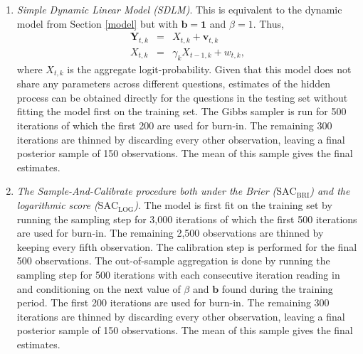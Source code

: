 \documentclass[aoas, preprint]{imsart}
\numberwithin{equation}{section}
\theoremstyle{plain}
\begin{document}
\begin{enumerate}
\item \textit{Simple Dynamic Linear Model (SDLM)}. This is equivalent to the dynamic model from Section \ref{model} but with $\boldsymbol{b} = \boldsymbol{1}$ and $\beta = 1$. Thus,
\begin{eqnarray*}
\boldsymbol{Y}_{t, k} &=&  X_{t, k} + \boldsymbol{v}_{t, k}  \\
X_{t, k} &=& \gamma_k X_{t-1, k} + w_{t, k},
\end{eqnarray*}
where $X_{t,k}$ is the aggregate logit-probability. Given that this model does not share any parameters across different questions, estimates of the hidden process can be obtained directly for the questions in the testing set without fitting the model first on the training set. The Gibbs sampler is run for 500 iterations of which the first 200 are used for burn-in. The remaining 300 iterations are thinned by discarding every other observation, leaving a final posterior sample of 150 observations. The mean of this sample gives the final estimates. 

\item \textit{The Sample-And-Calibrate procedure both under the Brier ($\text{SAC}_{\text{BRI}}$) and the logarithmic score ($\text{SAC}_{\text{LOG}}$)}. The model is first fit on the training set by running the sampling step for 3,000 iterations of which the first 500 iterations are used for burn-in. The remaining 2,500 observations are thinned by keeping every fifth observation. The calibration step is performed for the final 500 observations. The out-of-sample aggregation is done by running the sampling step for 500 iterations with each consecutive iteration reading in and conditioning on the next value of $\beta$ and $\boldsymbol{b}$ found during the training period. The first 200 iterations are used for burn-in. The remaining 300 iterations are thinned by discarding every other observation, leaving a final posterior sample of 150 observations. The mean of this sample gives the final estimates. 
 



\end{enumerate}
\end{document}
